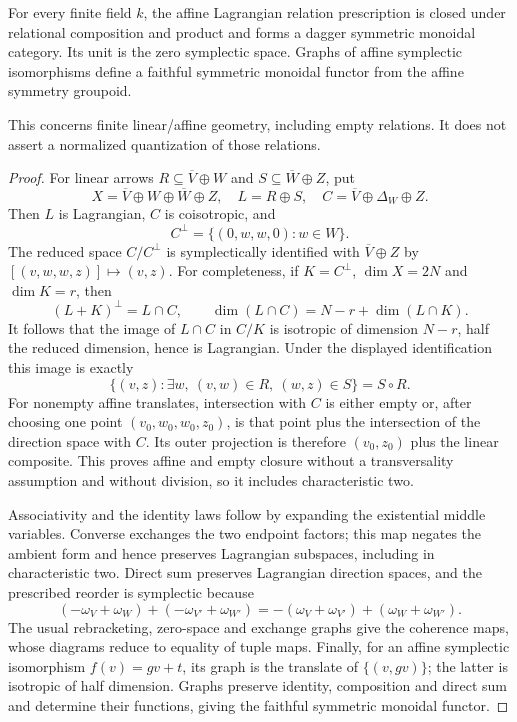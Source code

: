 \begin{proposition}
\statusProved{}
For every finite field $k$, the affine Lagrangian relation prescription is closed
under relational composition and product and forms a dagger symmetric monoidal
category. Its unit is the zero symplectic space. Graphs of affine symplectic
isomorphisms define a faithful symmetric monoidal functor from the affine symmetry
groupoid.
\end{proposition}
\begin{scope}
This concerns finite linear/affine geometry, including empty relations. It does not assert a normalized quantization of those relations.
\end{scope}

\begin{proof}
For linear arrows $R\subseteq\overline V\oplus W$ and
$S\subseteq\overline W\oplus Z$, put
\[
 X=\overline V\oplus W\oplus\overline W\oplus Z,
 \quad L=R\oplus S,
 \quad C=\overline V\oplus\Delta_W\oplus Z.
\]
Then $L$ is Lagrangian, $C$ is coisotropic, and
\[
 C^\perp=\{(0,w,w,0):w\in W\}.
\]
The reduced space $C/C^\perp$ is symplectically identified with
$\overline V\oplus Z$ by
$[(v,w,w,z)]\mapsto(v,z)$.  For completeness, if $K=C^\perp$,
$\dim X=2N$ and $\dim K=r$, then
\[
 (L+K)^\perp=L\cap C,
 \qquad
 \dim(L\cap C)=N-r+\dim(L\cap K).
\]
It follows that the image of $L\cap C$ in $C/K$ is isotropic of dimension
$N-r$, half the reduced dimension, hence is Lagrangian.  Under the displayed
identification this image is exactly
\[
 \{(v,z):\exists w,\ (v,w)\in R,\ (w,z)\in S\}=S\circ R.
\]
For nonempty affine translates, intersection with $C$ is either empty or,
after choosing one point $(v_0,w_0,w_0,z_0)$, is that point plus the
intersection of the direction space with $C$.  Its outer projection is
therefore $(v_0,z_0)$ plus the linear composite.  This proves affine and
empty closure without a transversality assumption and without division, so
it includes characteristic two.

Associativity and the identity laws follow by expanding the existential
middle variables.  Converse exchanges the two endpoint factors; this map
negates the ambient form and hence preserves Lagrangian subspaces, including
in characteristic two.  Direct sum preserves Lagrangian direction spaces,
and the prescribed reorder is symplectic because
\[
 (-\omega_V+\omega_W)+(-\omega_{V'}+\omega_{W'})
 =-(\omega_V+\omega_{V'})+(\omega_W+\omega_{W'}).
\]
The usual rebracketing, zero-space and exchange graphs give the coherence
maps, whose diagrams reduce to equality of tuple maps.  Finally, for an
affine symplectic isomorphism $f(v)=gv+t$, its graph is the translate of
$\{(v,gv)\}$; the latter is isotropic of half dimension.  Graphs preserve
identity, composition and direct sum and determine their functions, giving
the faithful symmetric monoidal functor.
\end{proof}

